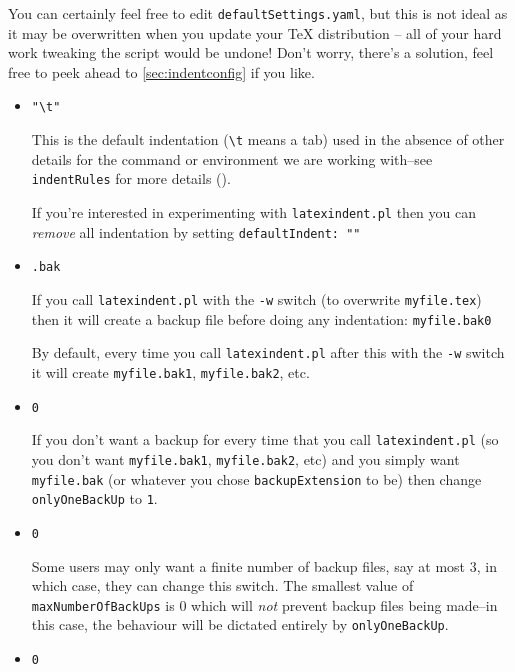 \documentclass[11pt]{article}
\newcommand{\verbitem}[1]{\small\PVerb{#1}}
\begin{document}
You can certainly feel free to edit \lstinline!defaultSettings.yaml!, but
this is not ideal as it may be overwritten when you update your \TeX{} distribution --
all of your hard work tweaking the script would be undone! Don't worry,
there's a solution, feel free to peek ahead to \cref{sec:indentconfig} if you like.
\begin{itemize}
	\item[\verbitem{defaultIndent}] \lstinline!"\t"!

	      This is the default indentation (\lstinline!\t! means a tab) used in the absence of other details
	      for the command or environment we are working with--see \lstinline!indentRules!
	      for more details ().

	      If you're interested in experimenting with \lstinline!latexindent.pl! then you
	      can \emph{remove} all indentation by setting \lstinline!defaultIndent: ""!
	\item[\verbitem{backupExtension}] \lstinline!.bak!

	      If you call \lstinline!latexindent.pl! with the \lstinline!-w! switch (to overwrite
	      \lstinline!myfile.tex!) then it will create a backup file before doing
	      any indentation: \lstinline!myfile.bak0!

	      By default, every time you call \lstinline!latexindent.pl! after this with
	      the \lstinline!-w! switch it will create \lstinline!myfile.bak1!, \lstinline!myfile.bak2!,
	      etc.
	\item[\verbitem{onlyOneBackUp}] \lstinline!0!

	      \label{page:onlyonebackup}
	      If you don't want a backup for every time that you call \lstinline!latexindent.pl! (so
	      you don't want \lstinline!myfile.bak1!, \lstinline!myfile.bak2!, etc) and you simply
	      want \lstinline!myfile.bak! (or whatever you chose \lstinline!backupExtension! to be)
	      then change \lstinline!onlyOneBackUp! to \lstinline!1!.

	\item[\verbitem{maxNumberOfBackUps}]\lstinline!0!

	      Some users may only want a finite number of backup files,
	      say at most $3$, in which case, they can change this switch.
	      The smallest value of \lstinline!maxNumberOfBackUps! is $0$ which will \emph{not}
	      prevent backup files being made--in this case, the behaviour will be dictated
	      entirely by \lstinline!onlyOneBackUp!.
	\item[\verbitem{cycleThroughBackUps}]\lstinline!0!


\end{itemize}
\end{document}

